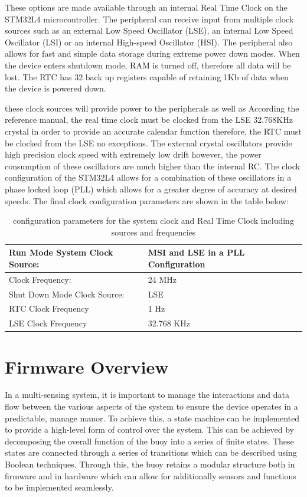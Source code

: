 These options are made available through an internal Real Time Clock on the STM32L4 microcontroller. The peripheral can receive input from multiple clock sources such as an external Low Speed Oscillator (LSE), an internal Low Speed Oscillator (LSI) or an internal High-speed Oscillator (HSI). The peripheral also allows for fast and simple data storage during extreme power down modes. When the device enters shutdown mode, RAM is turned off, therefore all data will be lost. The RTC has 32 back up registers capable of retaining 1Kb of data when the device is powered down. \par 

these clock sources will provide power to the peripherals as well as  According the reference manual, the real time clock must be clocked from the LSE 32.768KHz crystal in order to provide an accurate calendar function therefore, the RTC must be clocked from the LSE no exceptions. The external crystal oscillators provide high precision clock speed with extremely low drift however, the power consumption of these oscillators are much higher than the internal RC. The clock configuration of the STM32L4 allows for a combination of these oscillators in a phase locked loop (PLL) which allows for a greater degree of accuracy at desired speeds. The final clock configuration parameters are shown in the table below:

\begin{table}[H]
	\centering
	\caption{configuration parameters for the system clock and Real Time Clock including sources and frequencies}
	\begin{tabular}{|l|l|}
		\hline
		Run Mode System Clock Source: & MSI and LSE in a PLL Configuration \\
		\hline
		Clock Frequency: & 24 MHz \\
		\hline
		Shut Down Mode Clock Source: & LSE \\
		\hline 
		RTC Clock Frequency & 1 Hz \\
		\hline 
		LSE Clock Frequency  & 32.768 KHz \\
		\hline 
	\end{tabular}
	\label{tab:clock_conf}
\end{table}

\section{Firmware Overview}

In a multi-sensing system, it is important to manage the interactions and data flow between the various aspects of the system to ensure the device operates in a predictable, manage manor. To achieve this, a state machine can be implemented to provide a high-level form of control over the system. This can be achieved by decomposing the overall function of the buoy into a series of finite states. These states are connected through a series of transitions which can be described using Boolean techniques. Through this, the buoy retains a modular structure both in firmware and in hardware which can allow for additionally sensors and functions to be implemented seamlessly.\par 


